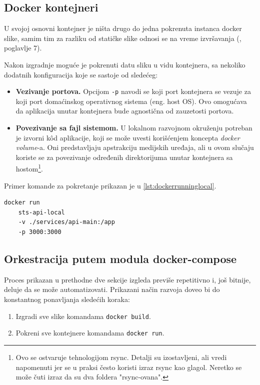 \documentclass[12pt,oneside]{memoir}
\begin{document}
\newpage
\subsection{Docker kontejneri}

U svojoj osnovni kontejner je ništa drugo do jedna pokrenuta instanca docker slike, samim tim za razliku od statičke slike odnosi se na vreme izvršavanja (\cite{dockerdeepdive}, poglavlje 7). 

Nakon izgradnje moguće je pokrenuti datu sliku u vidu kontejnera, sa nekoliko dodatnih konfiguracija koje se sastoje od sledećeg:
\begin{itemize}
    \item \textbf{Vezivanje portova.} Opcijom \verb|-p| navodi se koji port kontejnera se vezuje za koji port domaćinskog operativnog sistema (eng. host OS). Ovo omogućava da aplikacija unutar kontejnera bude agnostična od zauzetosti portova.
    \item \textbf{Povezivanje sa fajl sistemom.} U lokalnom razvojnom okruženju potreban je izvorni k\^{o}d aplikacije, koji se može uvesti korišćenjem koncepta \textit{docker volume}-a. Oni predstavljaju apstrakciju medijskih uređaja, ali u ovom slučaju koriste se za povezivanje određenih direktorijuma unutar kontejnera sa hostom\footnote{Ovo se ostvaruje tehnologijom rsync. Detalji su izostavljeni, ali vredi napomenuti jer se u praksi često koristi izraz rsync kao glagol. Neretko se može čuti izraz da su dva foldera "rsync-ovana".}.
\end{itemize}

Primer komande za pokretanje prikazan je u \ref{lst:dockerrunninglocal}.

\begin{lstlisting}[caption={Pokretanje kontejnera}, label={lst:dockerrunninglocal}]
docker run 
    sts-api-local 
    -v ./services/api-main:/app 
    -p 3000:3000
\end{lstlisting}

\subsection{Orkestracija putem modula docker-compose}

Proces prikazan u prethodne dve sekcije izgleda previše repetitivno i, još bitnije, deluje da se može automatizovati. Prikazani način razvoja doveo bi do konstantnog ponavljanja sledećih koraka:
\begin{enumerate}
    \item Izgradi sve slike komandama \verb|docker build|.
    \item Pokreni sve kontejnere komandama \verb|docker run|.
\end{enumerate}
\end{document}
